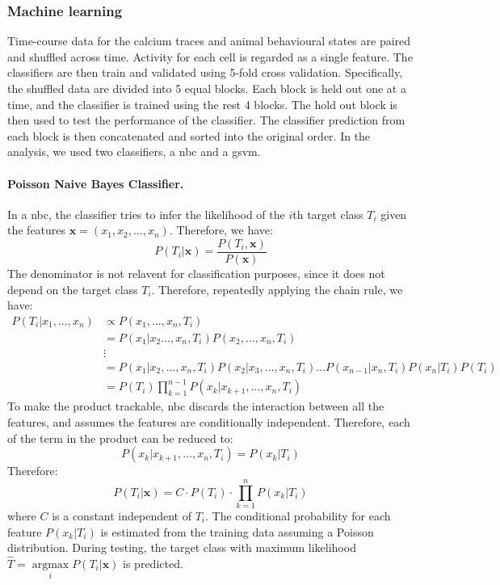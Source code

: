 \subsubsection{Machine learning}

Time-course data for the calcium traces and animal behavioural states are paired and shuffled across time. Activity for each cell is regarded as a single feature. The classifiers are then train and validated using 5-fold cross validation. Specifically, the shuffled data are divided into 5 equal blocks. Each block is held out one at a time, and the classifier is trained using the rest 4 blocks. The hold out block is then used to test the performance of the classifier. The classifier prediction from each block is then concatenated and sorted into the original order. In the analysis, we used two classifiers, a \gls{nbc} and a \gls{gsvm}. 

\paragraph{Poisson Naive Bayes Classifier.}
In a \gls{nbc}, the classifier tries to infer the likelihood of the $i$th target class $T_i$ given the features $\mathbf{x} = (x_1, x_2, \dots, x_n)$. Therefore, we have:
\begin{equation*}
    P(T_i|\mathbf{x}) = \frac{P(T_i, \mathbf{x})}{P(\mathbf{x})}
\end{equation*}
The denominator is not relavent for classification purposes, since it does not depend on the target class $T_i$. Therefore, repeatedly applying the chain rule, we have:
\begin{align*}
    P(T_i|x_1, \dots, x_n) &\propto P(x_1, \dots, x_n, T_i) \\
                           &= P(x_1|x_2 \dots, x_n, T_i) P(x_2, \dots, x_n, T_i) \\
                           &\vdots \\
                           &= P(x_1|x_2, \dots, x_n, T_i)  P(x_2|x_3, \dots, x_n, T_i) \ldots  P(x_{n-1}|x_n, T_i)  P(x_n|T_i)  P(T_i) \\
                           &= P(T_i)  \prod_{k=1}^{n-1} P(x_k|x_{k+1}, \dots, x_n, T_i)
\end{align*}
To make the product trackable, \gls{nbc} discards the interaction between all the features, and assumes the features are conditionally independent. Therefore, each of the term in the product can be reduced to:
\begin{equation*}
    P(x_k|x_{k+1}, \dots, x_n, T_i) = P(x_k|T_i)
\end{equation*}
Therefore:
\begin{equation*}
    P(T_i|\mathbf{x}) = C\cdot P(T_i) \cdot \prod_{k=1}^n P(x_k|T_i)
\end{equation*}
where $C$ is a constant independent of $T_i$. The conditional probability for each feature $P(x_k|T_i)$ is estimated from the training data assuming a Poisson distribution. During testing, the target class with maximum likelihood $\hat{T}=\underset{i}{\operatorname{argmax}} P(T_i|\mathbf{x})$ is predicted.

